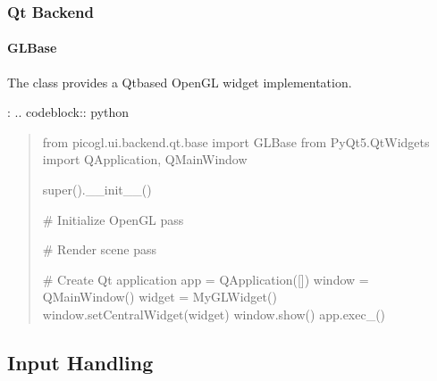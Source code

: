 \documentclass[a4paper,10pt,english,openany,oneside]{sphinxmanual}
\begin{document}
\subsubsection{Qt Backend}
\label{\detokenize{api/ui:qt-backend}}

\paragraph{GLBase}
\label{\detokenize{api/ui:glbase}}
\sphinxAtStartPar
The  class provides a Qt\sphinxhyphen{}based OpenGL widget implementation.

\sphinxAtStartPar
{}:
.. code\sphinxhyphen{}block:: python
\begin{quote}

\sphinxAtStartPar
from picogl.ui.backend.qt.base import GLBase
from PyQt5.QtWidgets import QApplication, QMainWindow
\begin{description}
\begin{description}
\sphinxAtStartPar
super().\_\_init\_\_()

\sphinxAtStartPar
\# Initialize OpenGL
pass

\sphinxAtStartPar
\# Render scene
pass

\end{description}

\end{description}

\sphinxAtStartPar
\# Create Qt application
app = QApplication({[}{]})
window = QMainWindow()
widget = MyGLWidget()
window.setCentralWidget(widget)
window.show()
app.exec\_()
\end{quote}


\subsection{Input Handling}
\label{\detokenize{api/ui:input-handling}}
\end{document}
